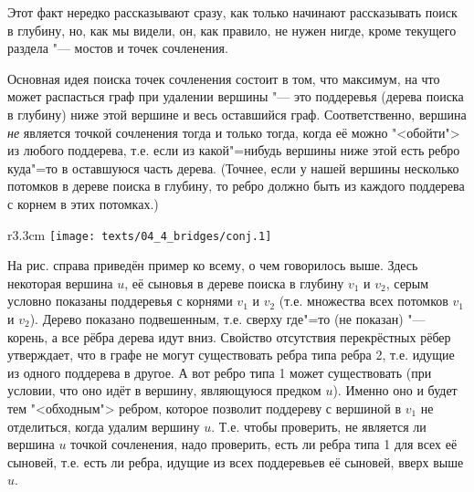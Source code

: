 
Этот факт нередко рассказывают сразу, как только начинают рассказывать поиск в глубину, но, как мы видели,
он, как правило, не нужен нигде, кроме текущего раздела "--- мостов и точек сочленения. 

Основная идея поиска точек сочленения состоит в том, что максимум, на что может распасться
граф при удалении вершины "--- это поддеревья (дерева поиска в глубину) ниже этой вершине и весь оставшийся граф.
Соответственно, вершина \textit{не} является точкой сочленения тогда и только тогда, когда её можно "<обойти">
из любого поддерева, т.е. если из какой"=нибудь вершины ниже этой есть ребро куда"=то в оставшуюся часть дерева.
(Точнее, если у нашей вершины несколько потомков в дереве поиска в глубину, то ребро должно быть
из каждого поддерева с корнем в этих потомках.) 

\begin{wrapfigure}{r}{3.3cm}
\texttt{[image: texts/04\_4\_bridges/conj.1]}
\end{wrapfigure}

На рис. справа приведён пример ко всему, о чем говорилось выше. Здесь некоторая вершина $u$, её сыновья
в дереве поиска в глубину $v_1$ и $v_2$, серым условно показаны поддеревья с корнями $v_1$ и $v_2$
(т.е. множества всех потомков $v_1$ и $v_2$). Дерево показано подвешенным, т.е. сверху где"=то (не показан)
"--- корень, а все рёбра дерева идут вниз. Свойство отсутствия перекрёстных рёбер утверждает, что
в графе не могут существовать ребра типа ребра 2, т.е. идущие из одного поддерева в другое.
А вот ребро типа 1 может существовать (при условии, что оно идёт в вершину, являющуюся предком $u$). 
Именно оно и будет тем "<обходным">
ребром, которое позволит поддереву с вершиной в $v_1$ не отделиться, когда удалим вершину $u$. Т.е.
чтобы проверить, не является ли вершина $u$ точкой сочленения, надо проверить, есть ли ребра типа 1
для всех её сыновей, т.е. есть ли ребра, идущие из всех поддеревьев её сыновей, вверх выше $u$.

